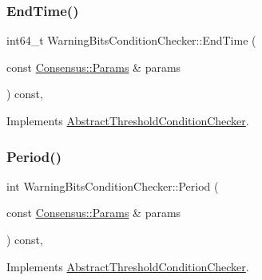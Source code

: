 \subsubsection{\texorpdfstring{End\+Time()}{EndTime()}}
{\footnotesize\ttfamily int64\+\_\+t Warning\+Bits\+Condition\+Checker\+::\+End\+Time (\begin{DoxyParamCaption}\item[{const \mbox{\hyperlink{chainparams_8h_a5e1ca1b35c3dd1a4e20f18445f28dd9c}{Consensus\+::\+Params}} \&}]{params }\end{DoxyParamCaption}) const\hspace{0.3cm}{\ttfamily [inline]}, {\ttfamily [virtual]}}



Implements \mbox{\hyperlink{class_abstract_threshold_condition_checker_a798df83d41a24e8ca12c02fb25d07c1c}{Abstract\+Threshold\+Condition\+Checker}}.

\mbox{\label{class_warning_bits_condition_checker_af6dd78109426020b259b70c07bc858d7}} 
\subsubsection{\texorpdfstring{Period()}{Period()}}
{\footnotesize\ttfamily int Warning\+Bits\+Condition\+Checker\+::\+Period (\begin{DoxyParamCaption}\item[{const \mbox{\hyperlink{chainparams_8h_a5e1ca1b35c3dd1a4e20f18445f28dd9c}{Consensus\+::\+Params}} \&}]{params }\end{DoxyParamCaption}) const\hspace{0.3cm}{\ttfamily [inline]}, {\ttfamily [virtual]}}



Implements \mbox{\hyperlink{class_abstract_threshold_condition_checker_a34b66faf36426413918aedda5213d110}{Abstract\+Threshold\+Condition\+Checker}}.

\mbox{\label{class_warning_bits_condition_checker_af2de7b32547b0677594b1bfbdacd19ad}} 
